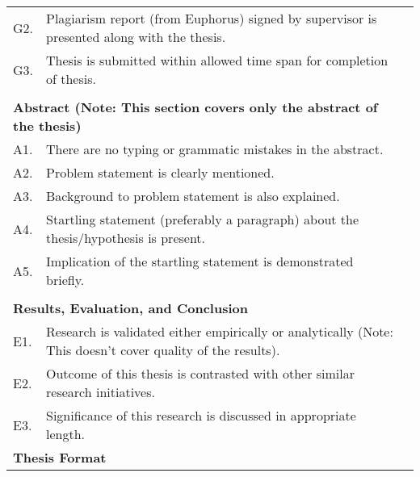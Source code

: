 \begin{table}[]
\begin{tabular}{lll}
G2.            & Plagiarism   report (from Euphorus) signed by supervisor is presented along with the   thesis.                  &  \\
G3.            & Thesis is submitted   within allowed time span for completion of thesis.                                        &  \\
               &                                                                                                                 &  \\
\multicolumn{2}{l}{\textbf{Abstract (Note:   This section covers only the abstract of the thesis)}}                              &  \\
A1.            & There are no typing or grammatic   mistakes in the abstract.                                                    &  \\
A2.            & Problem statement is   clearly mentioned.                                                                       &  \\
A3.            & Background to problem   statement is also explained.                                                            &  \\
A4.            & Startling statement   (preferably a paragraph) about the thesis/hypothesis is present.                          &  \\
A5.            & Implication of the   startling statement is demonstrated briefly.                                               &  \\
               &                                                                                                                 &  \\
\multicolumn{2}{l}{\textbf{Results, Evaluation, and Conclusion}}                                                                 &  \\
E1.            & Research is   validated either empirically or analytically (Note: This doesn’t cover   quality of the results). &  \\
E2.            & Outcome of this   thesis is contrasted with other similar research initiatives.                                 &  \\
E3.            & Significance of this   research is discussed in appropriate length.                                             &  \\
\multicolumn{2}{l}{\textbf{Thesis Format}}                                                                                       &  \\

\end{tabular}
\end{table}

